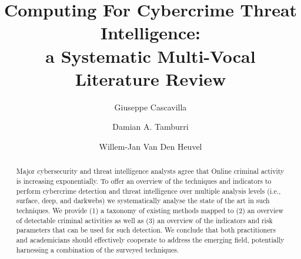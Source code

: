 \documentclass[manuscript, review, screen]{acmart}
\begin{document}
\title{Computing For Cybercrime Threat Intelligence:\\ a Systematic Multi-Vocal Literature Review}

\author{Giuseppe Cascavilla}

\author{Damian A. Tamburri}

\author{Willem-Jan Van Den Heuvel}



\begin{abstract}
Major cybersecurity and threat intelligence analysts agree that Online criminal activity is increasing exponentially. To offer an overview of the techniques and indicators to perform cybercrime detection and threat intelligence over multiple analysis levels (i.e., surface, deep, and darkwebs) we systematically analyse the state of the art in such techniques. We provide (1) a taxonomy of existing methods mapped to (2) an overview of detectable criminal activities as well as (3) an overview of the indicators and risk parameters that can be used for such detection. We conclude that both practitioners and academicians should effectively cooperate to address the emerging field, potentially harnessing a combination of the surveyed techniques.
\end{abstract}
\end{document}
